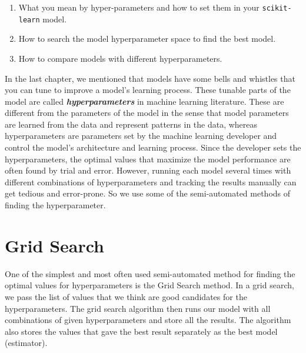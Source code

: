 \documentclass[
  letterpaper,
]{book}
\providecommand{\tightlist}{%
  \setlength{\itemsep}{0pt}\setlength{\parskip}{0pt}}\usepackage{longtable,booktabs,array}
\begin{document}
\begin{tcolorbox}[standard jigsaw,bottomtitle=1mm, titlerule=0mm, title={In this chapter you'll learn:}, leftrule=.75mm, toptitle=1mm, arc=.35mm, rightrule=.15mm, opacitybacktitle=0.6, colframe=quarto-callout-caution-color-frame, bottomrule=.15mm, colbacktitle=quarto-callout-caution-color!10!white, colback=white, toprule=.15mm, left=2mm, coltitle=black, opacityback=0]

\begin{enumerate}
\def\labelenumi{\arabic{enumi}.}
\tightlist
\item
  What you mean by hyper-parameters and how to set them in your
  \texttt{scikit-learn} model.
\item
  How to search the model hyperparameter space to find the best model.
\item
  How to compare models with different hyperparameters.
\end{enumerate}

\end{tcolorbox}

In the last chapter, we mentioned that models have some bells and
whistles that you can tune to improve a model's learning process. These
tunable parts of the model are called \textbf{\emph{hyperparameters}} in
machine learning literature. These are different from the parameters of
the model in the sense that model parameters are learned from the data
and represent patterns in the data, whereas hyperparameters are
parameters set by the machine learning developer and control the model's
architecture and learning process. Since the developer sets the
hyperparameters, the optimal values that maximize the model performance
are often found by trial and error. However, running each model several
times with different combinations of hyperparameters and tracking the
results manually can get tedious and error-prone. So we use some of the
semi-automated methods of finding the hyperparameter.

\hypertarget{grid-search}{%
\section{Grid Search}\label{grid-search}}

One of the simplest and most often used semi-automated method for
finding the optimal values for hyperparameters is the Grid Search
method. In a grid search, we pass the list of values that we think are
good candidates for the hyperparameters. The grid search algorithm then
runs our model with all combinations of given hyperparameters and store
all the results. The algorithm also stores the values that gave the best
result separately as the best model (estimator).
\end{document}
